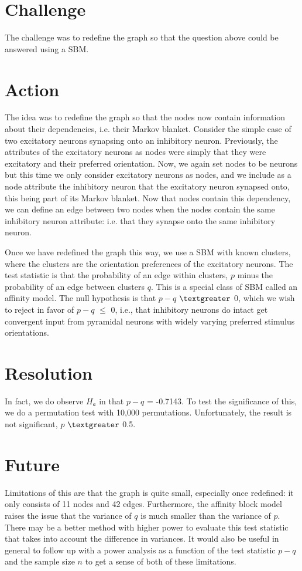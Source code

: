 \documentclass[12pt]{article}
\begin{document}
\section*{Challenge} The challenge was to redefine the graph so that the question above could be answered using a SBM.

\section*{Action} The idea was to redefine the graph so that the nodes now contain information about their dependencies, i.e. their Markov blanket. Consider the simple case of two excitatory neurons synapsing onto an inhibitory neuron. Previously, the attributes of the excitatory neurons as nodes were simply that they were excitatory and their preferred orientation. Now, we again set nodes to be neurons but this time we only consider excitatory neurons as nodes, and we include as a node attribute the inhibitory neuron that the excitatory neuron synapsed onto, this being part of its Markov blanket. Now that nodes contain this dependency, we can define an edge between two nodes when the nodes contain the same inhibitory neuron attribute: i.e. that they synapse onto the same inhibitory neuron. 

Once we have redefined the graph this way, we use a SBM with known clusters, where the clusters are the orientation preferences of the excitatory neurons. The test statistic is that the probability of an edge within clusters, $p$ minus the probability of an edge between clusters $q$. This is a special class of SBM called an affinity model. The null hypothesis is that $p-q$ $\textgreater$ 0, which we wish to reject in favor of $p-q$ $\leq$ 0, i.e., that inhibitory neurons do intact get convergent input from pyramidal neurons with widely varying preferred stimulus orientations. 

\section*{Resolution} 

In fact, we do observe $H_a$ in that $p-q$ = -0.7143. To test the significance of this, we do a permutation test with 10,000 permutations. Unfortunately, the result is not significant, $p$ $\textgreater$ 0.5. 

\section*{Future} 
Limitations of this are that the graph is quite small, especially once redefined: it only consists of 11 nodes and 42 edges. Furthermore, the affinity block model raises the issue that the variance of $q$ is much smaller than the variance of $p$. There may be a better method with higher power to evaluate this test statistic that takes into account the difference in variances. It would also be useful in general to follow up with a power analysis as a function of the test statistic $p-q$ and the sample size $n$ to get a sense of both of these limitations. 
\end{document}
